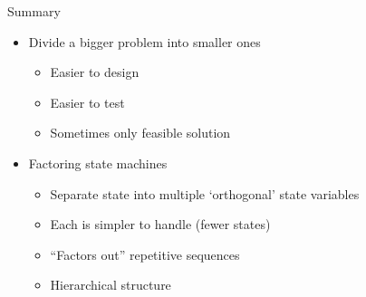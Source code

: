 \begin{frame}[fragile]{Summary}
\begin{itemize}
\item Divide a bigger problem into smaller ones
\begin{itemize}
\item Easier to design
\item Easier to test
\item Sometimes only feasible solution
\end{itemize}
\item Factoring state machines
\begin{itemize}
\item Separate state into multiple `orthogonal' state variables
\item Each is simpler to handle (fewer states)
\item ``Factors out'' repetitive sequences
\item Hierarchical structure
\end{itemize}
\end{itemize}
\end{frame}






